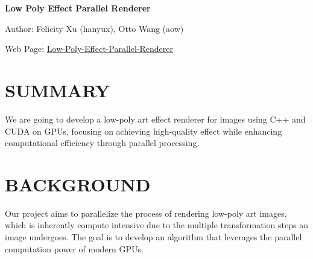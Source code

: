 \documentclass[12pt]{article}
\theoremstyle{definition}
\theoremstyle{plain}
\begin{document}
\begin{center}
{\huge \bf Low Poly Effect Parallel Renderer}
\vspace{2em}

{\large Author: Felicity Xu (hanyux), Otto Wang (aow)}

{\large Web Page: \href{https://veloxtime.github.io/Low-Poly-Effect-Parallel-Algorithm/}{Low-Poly-Effect-Parallel-Renderer}}
\end{center}

\section{SUMMARY}
We are going to develop a low-poly art effect renderer for images using C++ and CUDA on GPUs, focusing on achieving high-quality effect while enhancing computational efficiency through parallel processing.

\bigskip
\section{BACKGROUND}

Our project aims to parallelize the process of rendering low-poly art images, which
is inherently compute intensive due to the multiple transformation steps an image
undergoes. The goal is to develop an algorithm that leverages the parallel
computation power of modern GPUs.

\end{document}
